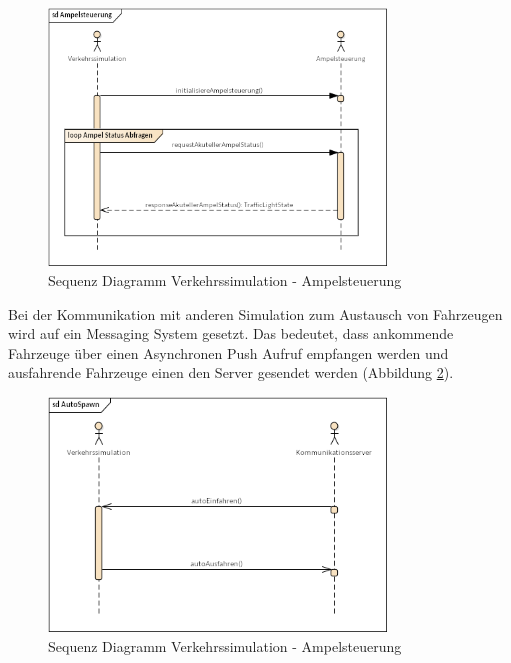 \begin{figure}[H]
\begin{center}
	\includegraphics[width=0.8\textwidth]{BilderAllgemein/Ampelsteuerung.png}
\end{center}
	\caption{Sequenz Diagramm Verkehrssimulation - Ampelsteuerung}
	\label{fig_2_2}
\end{figure}

Bei der Kommunikation mit anderen Simulation zum Austausch von Fahrzeugen wird auf ein Messaging System gesetzt. Das bedeutet, dass ankommende Fahrzeuge über einen Asynchronen Push Aufruf empfangen werden und ausfahrende Fahrzeuge einen den Server gesendet werden
(Abbildung \ref{fig_2_4}).  

\begin{figure}[H]
\begin{center}
	\includegraphics[width=0.8\textwidth]{BilderAllgemein/AutoSpawn.png}
\end{center}
	\caption{Sequenz Diagramm Verkehrssimulation - Ampelsteuerung}
	\label{fig_2_4}
\end{figure}

